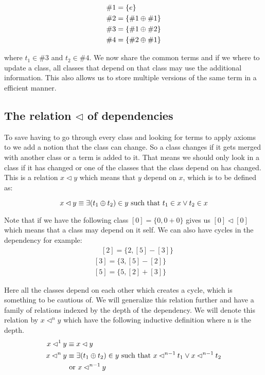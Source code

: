 \begin{equation*}
\begin{aligned}
\#1 & = \{e\} \\
\#2 &= \{\#1 \oplus \#1\} \\
\#3 &= \{ \#1 \oplus \#2\} \\
\#4 &= \{ \#2 \oplus \#1\}
\end{aligned}
\end{equation*}

where $t_1 \in \#3$ and $t_2 \in \#4$. We now share the common terms and if we 
where to update a class, all classes that depend on that class may use the additional information. %
This also allows us to store multiple versions of the same term in a efficient 
manner.

\subsection{The relation $\lhd$ of dependencies}
To save having to go through every class and looking for terms to apply axioms to
we add a notion that the class can change. So a class changes if it gets merged
with another class or a term is added to it. That means we should only look in a
class if it has changed or one of the classes that the class depend on has changed.
This is a relation $x \lhd y$ which means that $y$ depend
on $x$, which is to be defined as:  

\begin{equation*}
x \lhd y \equiv \exists (t_1 \oplus t_2) \in y \text{ such that } t_1 \in x
\vee t_2 \in x
\end{equation*}

Note that if we have the following class $[0] = \{0, 0 + 0\}$ gives us $[0] \lhd [0]$
which means that a class may depend on it self. We can also have cycles in the dependency
for example:
\begin{equation*}
\begin{aligned}
\quad [2] = \{ 2 , [5] - [3] \} \\ %
[3] = \{ 3 , [5] - [2] \} \\
[5] = \{ 5 , [2] + [3] \}
\end{aligned}
\end{equation*}

Here all the classes depend on each other which creates a cycle, which is something
to be cautious of. We will generalize this relation
further and have a family of relations indexed by the depth of the dependency.
We will denote this relation by $x \lhd^n y$ which have the following inductive
definition where n is the depth.
\begin{equation*}
\begin{aligned}
x \lhd^1 y &\equiv x \lhd y \\
x \lhd^n y &\equiv \exists (t_1 \oplus t_2) \in y \text { such that } 
x \lhd^{n-1} t_1 \vee x \lhd^{n-1} t_2 \\
& \text{ or } x \lhd^{n-1} y
\end{aligned}
\end{equation*}

